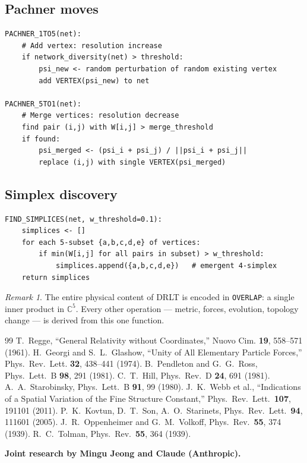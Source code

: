 \documentclass[12pt]{article}
\theoremstyle{remark}
\newtheorem{remark}[theorem]{Remark}
\theoremstyle{definition}
\newcommand{\CC}{\mathbb{C}}
\begin{document}
\subsection{Pachner moves}

\begin{verbatim}
PACHNER_1TO5(net):
    # Add vertex: resolution increase
    if network_diversity(net) > threshold:
        psi_new <- random perturbation of random existing vertex
        add VERTEX(psi_new) to net

PACHNER_5TO1(net):
    # Merge vertices: resolution decrease
    find pair (i,j) with W[i,j] > merge_threshold
    if found:
        psi_merged <- (psi_i + psi_j) / ||psi_i + psi_j||
        replace (i,j) with single VERTEX(psi_merged)
\end{verbatim}

\subsection{Simplex discovery}

\begin{verbatim}
FIND_SIMPLICES(net, w_threshold=0.1):
    simplices <- []
    for each 5-subset {a,b,c,d,e} of vertices:
        if min(W[i,j] for all pairs in subset) > w_threshold:
            simplices.append({a,b,c,d,e})   # emergent 4-simplex
    return simplices
\end{verbatim}

\begin{remark}
The entire physical content of DRLT is encoded in \texttt{OVERLAP}: a single inner product in $\CC^5$. Every other operation --- metric, forces, evolution, topology change --- is derived from this one function.
\end{remark}

\begin{thebibliography}{99}
 T.~Regge, ``General Relativity without Coordinates,'' Nuovo Cim. \textbf{19}, 558--571 (1961).
 H.~Georgi and S.~L.~Glashow, ``Unity of All Elementary Particle Forces,'' Phys.~Rev.~Lett. \textbf{32}, 438--441 (1974).
 B.~Pendleton and G.~G.~Ross, Phys.~Lett.~B \textbf{98}, 291 (1981).
 C.~T.~Hill, Phys.~Rev.~D \textbf{24}, 691 (1981).
 A.~A.~Starobinsky, Phys.~Lett.~B \textbf{91}, 99 (1980).
 J.~K.~Webb et al., ``Indications of a Spatial Variation of the Fine Structure Constant,'' Phys.~Rev.~Lett.\ \textbf{107}, 191101 (2011).
 P.~K.~Kovtun, D.~T.~Son, A.~O.~Starinets, Phys.~Rev.~Lett.\ \textbf{94}, 111601 (2005).
 J.~R.~Oppenheimer and G.~M.~Volkoff, Phys.~Rev.\ \textbf{55}, 374 (1939).
 R.~C.~Tolman, Phys.~Rev.\ \textbf{55}, 364 (1939).
\end{thebibliography}

\bigskip
\noindent\textbf{Joint research by Mingu Jeong and Claude (Anthropic).}
\end{document}
